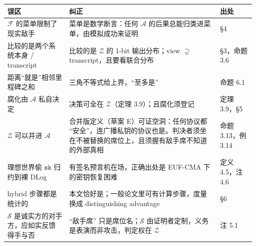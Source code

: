 \begin{longtable}[]{@{}
  >{\raggedright\arraybackslash}p{}
  >{\raggedright\arraybackslash}p{}
  >{\raggedright\arraybackslash}p{}@{}}
\toprule\noalign{}
\begin{minipage}[b]{\linewidth}\raggedright
误区
\end{minipage} & \begin{minipage}[b]{\linewidth}\raggedright
纠正
\end{minipage} & \begin{minipage}[b]{\linewidth}\raggedright
出处
\end{minipage} \\
\midrule\noalign{}
\endhead
\bottomrule\noalign{}
\endlastfoot
$\mathcal{F}$ 的菜单限制了现实敌手 &
菜单是数学断言：任何 $\mathcal{A}$ 的后果总能归类进菜单，由模拟成功来证明
& §4 \\
比较的是两个系统本身 / transcript & 比较的是 $\mathcal{Z}$ 的 1-bit
输出分布；view $\supsetneq$ transcript，且要看联合分布 & §3，命题
3.6 \\
距离“就是”相邻里程碑之和 & 三角不等式给上界，“至多是”& 命题
6.1 \\
腐化由 $\mathcal{A}$ 私自决定 & 决策可全在 $\mathcal{Z}$（定理
3.9）；且腐化须登记 & 定理 3.9，§5 \\
$\mathcal{Z}$ 可以并进 $\mathcal{A}$ & 合并版定义（草案
E）可证空洞：任何协议都
“安全”，连广播私钥的协议也是。判决者须坐在不被替换的席位上，且须握有敌手席不知道的外部真相
& 命题 3.13，例 3.14 \\
理想世界偷 $\mathtt{sk}$ 归约到裸 DLog & 有签名预言机在场，正确出处是
EUF-CMA 下的密钥恢复困难 & 定义 4.5，注 4.6 \\
hybrid 步骤都是统计的 & 本文恰好是；一般论文里可有计算步骤，度量换成
distinguishing advantage & §6 \\
$\mathcal{S}$ 是诚实方的对手方，应如实反馈得手与否 &“敌手席”
只是席位名；$\mathcal{S}$ 由证明者定制，义务是表演而非攻击，判定权在 $\mathcal{Z}$
& 注 5.1 \\
\end{longtable}
